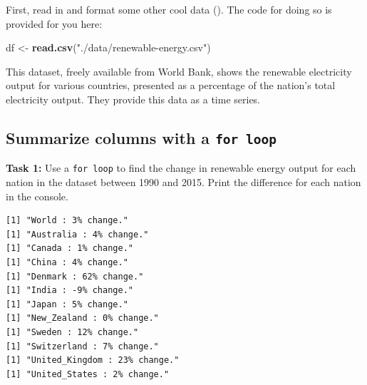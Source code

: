 \documentclass[
]{book}
\newenvironment{Shaded}{\begin{snugshade}}{\end{snugshade}}
\newcommand{\CommentTok}[1]{\textcolor[rgb]{0.56,0.35,0.01}{\textit{#1}}}
\newcommand{\ControlFlowTok}[1]{\textcolor[rgb]{0.13,0.29,0.53}{\textbf{#1}}}
\newcommand{\DecValTok}[1]{\textcolor[rgb]{0.00,0.00,0.81}{#1}}
\newcommand{\KeywordTok}[1]{\textcolor[rgb]{0.13,0.29,0.53}{\textbf{#1}}}
\newcommand{\NormalTok}[1]{#1}
\newcommand{\OperatorTok}[1]{\textcolor[rgb]{0.81,0.36,0.00}{\textbf{#1}}}
\newcommand{\StringTok}[1]{\textcolor[rgb]{0.31,0.60,0.02}{#1}}
\begin{document}
First, read in and format some other cool data (). The code for doing so is provided for you here:

\begin{Shaded}
\begin{Highlighting}[]
\NormalTok{df <-}\StringTok{ }\KeywordTok{read.csv}\NormalTok{(}\StringTok{"./data/renewable-energy.csv"}\NormalTok{)}
\end{Highlighting}
\end{Shaded}

This dataset, freely available from World Bank, shows the renewable electricity output for various countries, presented as a percentage of the nation's total electricity output. They provide this data as a time series.

\hypertarget{summarize-columns-with-a-for-loop}{%
\subsection*{\texorpdfstring{Summarize columns with a \texttt{for\ loop}}{Summarize columns with a for loop}}\label{summarize-columns-with-a-for-loop}}

\textbf{Task 1:} Use a \texttt{for\ loop} to find the change in renewable energy output for each nation in the dataset between 1990 and 2015. Print the difference for each nation in the console.

\begin{Shaded}
\end{Shaded}

\begin{verbatim}
[1] "World : 3% change."
[1] "Australia : 4% change."
[1] "Canada : 1% change."
[1] "China : 4% change."
[1] "Denmark : 62% change."
[1] "India : -9% change."
[1] "Japan : 5% change."
[1] "New_Zealand : 0% change."
[1] "Sweden : 12% change."
[1] "Switzerland : 7% change."
[1] "United_Kingdom : 23% change."
[1] "United_States : 2% change."
\end{verbatim}
\end{document}
